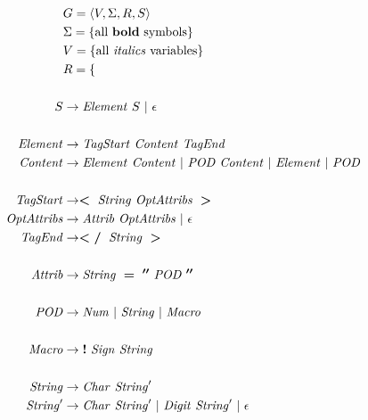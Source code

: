 \documentclass{article}
\begin{document}
\begin{align*}
	                    & G                    = \langle V, \Sigma, R, S \rangle               \\
	                    & \Sigma               = \{ \text{all \textbf{bold} symbols} \}        \\
	                    & V                    = \{ \text{all \textit{italics} variables} \}   \\
	                    & R                    = \{                                            \\
	\\
	S                   & \rightarrow \mathit{Element} ~ S ~|~ \epsilon                        \\
	\\
	\mathit{Element}    & \rightarrow \mathit{TagStart} ~ \mathit{Content} ~ \mathit{TagEnd}   \\
	\mathit{Content}    & \rightarrow \mathit{Element} ~ \mathit{Content} ~|~
	\mathit{POD} ~ \mathit{Content} ~|~ \mathit{Element} ~|~ \mathit{POD}                      \\
	\\
	\mathit{TagStart}   & \rightarrow \boldsymbol{<} ~
	\mathit{String} ~ \mathit{OptAttribs} ~ \boldsymbol{>}                                     \\
	\mathit{OptAttribs} & \rightarrow \mathit{Attrib} ~ \mathit{OptAttribs} ~|~ \epsilon       \\
	\mathit{TagEnd}     & \rightarrow \boldsymbol{</} ~
	\mathit{String} ~ \boldsymbol{>}                                                           \\
	\\
	\mathit{Attrib}     & \rightarrow \mathit{String} ~ \boldsymbol{=} ~
	\boldsymbol{''} ~ \mathit{POD} ~ \boldsymbol{''}                                           \\
	\\
	\mathit{POD}        & \rightarrow \mathit{Num} ~|~ \mathit{String} ~|~ \mathit{Macro}      \\
	\\
	\mathit{Macro}      & \rightarrow \boldsymbol{!} ~ \mathit{Sign} ~ \mathit{String}         \\
	\\
	\mathit{String}     & \rightarrow \mathit{Char} ~ \mathit{String}'                         \\
	\mathit{String}'    & \rightarrow \mathit{Char} ~ \mathit{String}' ~|~
	\mathit{Digit} ~ \mathit{String}' ~|~ \epsilon                                             \\

\end{align*}
\end{document}
